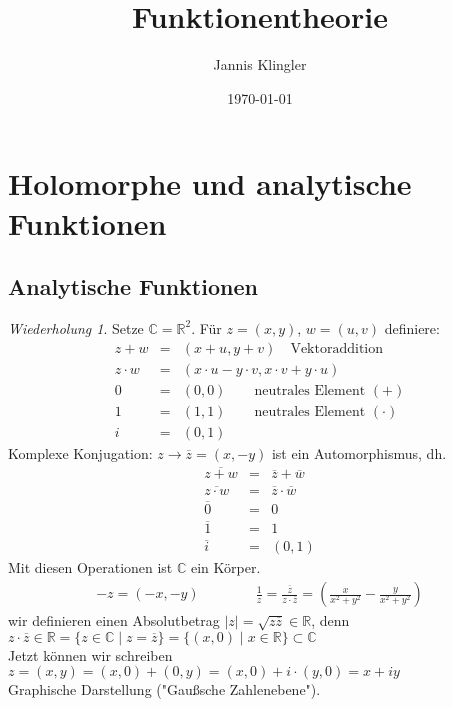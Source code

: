 \documentclass[11pt,titlepage]{article}
\title{Funktionentheorie}
\author{Jannis Klingler}
\date{\today}
\theoremstyle{definition}
\theoremstyle{remark}
\newtheorem*{repetition}{Wiederholung}
\begin{document}
	\maketitle
	
	\newpage
	\tableofcontents
	\newpage

	\section{Holomorphe und analytische Funktionen}

	\subsection{Analytische Funktionen}
	
	\begin{repetition}
		Setze $\mathbb{C}=\mathbb{R}^2$. Für $z=(x,y)$, $w=(u,v)$ definiere:
		\begin{eqnarray*}
			z+w&=&(x+u,y+v) \quad\text{Vektoraddition} \\
			z\cdot w&=&(x\cdot u-y\cdot v,x\cdot v+y\cdot u) \\
			0&=&(0,0) \qquad\text{neutrales Element $(+)$}\\
			1&=&(1,1) \qquad\text{neutrales Element $(\cdot )$}\\
			i&=&(0,1)
		\end{eqnarray*}
		Komplexe Konjugation: $z\to \overline{z} =(x,-y)$ ist ein Automorphismus, dh.
		\begin{eqnarray*}
			\overline{z+w} &=& \overline{z} +\overline{w} \\
			\overline{z\cdot w} &=& \overline{z} \cdot \overline{w} \\
			\overline{0} &=& 0\\
			\overline{1} &=& 1 \\
			\overline{i} &=& (0,1)
		\end{eqnarray*}
		Mit diesen Operationen ist $\mathbb{C}$ ein Körper.
		\begin{eqnarray*}
			-z=(-x,-y) \qquad \qquad \frac{1}{z}=\frac{\overline{z}}{z\cdot \overline{z}}=\left(
			\frac{x}{x^2 +y^2}-\frac{y}{x^2 +y^2} \right)
		\end{eqnarray*}
		wir definieren einen Absolutbetrag $|z| = \sqrt{z\overline{z}}\in \mathbb{R}$, denn 
		$z\cdot\overline{z} \in \mathbb{R} =\{ z\in \mathbb{C} \mid z=\overline{z} \} =
		\{ (x,0)\mid x\in\mathbb{R} \} \subset \mathbb{C}$ \\
		Jetzt können wir schreiben $z=(x,y)=(x,0)+(0,y)=(x,0)+i\cdot (y,0)=x+iy$ \\
		Graphische Darstellung ("Gaußsche Zahlenebene").
	\end{repetition}
	
\end{document}
